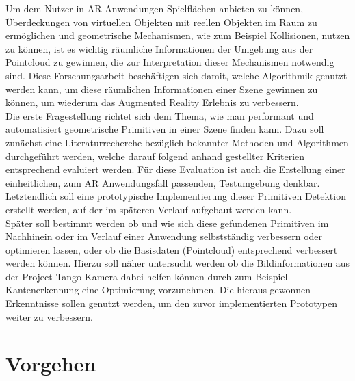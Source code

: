 Um dem Nutzer in AR Anwendungen Spielflächen anbieten zu können, Überdeckungen von virtuellen Objekten mit reellen Objekten im Raum zu ermöglichen und geometrische Mechanismen, wie zum Beispiel Kollisionen, nutzen zu können, ist es wichtig räumliche Informationen der Umgebung aus der Pointcloud zu gewinnen, die zur Interpretation dieser Mechanismen notwendig sind. Diese Forschungsarbeit beschäftigen sich damit, welche Algorithmik genutzt werden kann, um diese räumlichen Informationen einer Szene gewinnen zu können, um wiederum das Augmented Reality Erlebnis zu verbessern.\\

\iffalse
Die erste Fragestellung richtet sich dem Thema, wie man performant und automatisiert geometrische Primitiven in einer Szene finden kann. Dazu soll zunächst eine Literaturrecherche bezüglich bekannter Methoden und Algorithmen durchgeführt werden, welche darauf folgend anhand gestellter Kriterien entsprechend evaluiert werden. Für diese Evaluation ist auch die Erstellung einer einheitlichen, zum AR Anwendungsfall passenden, Testumgebung denkbar. Letztendlich soll eine prototypische Implementierung dieser Primitiven Detektion erstellt werden, auf der im späteren Verlauf aufgebaut werden kann.\\

Später soll bestimmt werden ob und wie sich diese gefundenen Primitiven im Nachhinein oder im Verlauf einer Anwendung selbstständig verbessern oder optimieren lassen, oder ob die Basisdaten (Pointcloud) entsprechend verbessert werden können. Hierzu soll näher untersucht werden ob die Bildinformationen aus der Project Tango Kamera dabei helfen können durch zum Beispiel Kantenerkennung eine Optimierung vorzunehmen. Die hieraus gewonnen Erkenntnisse sollen genutzt werden, um den zuvor implementierten Prototypen weiter zu verbessern.\\

\endif

\section{Vorgehen}
